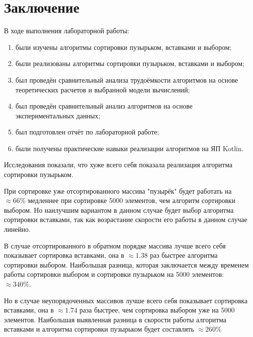 \documentclass[12pt]{report}
\begin{document}
\chapter*{Заключение}
В ходе выполнения лабораторной работы:
\begin{enumerate}
\item были изучены алгоритмы сортировки пузырьком, вставками и выбором;
\item были реализованы алгоритмы сортировки пузырьком, вставками и выбором;
\item был проведён сравнительный анализа трудоёмкости алгоритмов на основе теоретических расчетов и выбранной модели вычислений;
\item был проведён сравнительный анализ алгоритмов на основе экспериментальных данных;
\item был подготовлен отчёт по лабораторной работе;
\item были получены практические навыки реализации алгоритмов на ЯП Kotlin.
\end{enumerate}

Исследования показали, что хуже всего себя показала реализация алгоритма сортировки пузырьком.

При сортировке уже отсортированного массива "пузырёк" будет работать на $\approx 66\%$ медленнее при сортировке 5000 элементов, чем алгоритм сортировки выбором. Но наилучшим вариантом в данном случае будет выбор алгоритма сортировки вставками, так как возрастание скорости его работы в данном случае линейно.

В случае отсортированного в обратном порядке массива лучше всего себя показывает сортировка вставками, она в $\approx 1.38$ раз быстрее алгоритма сортировки выбором. Наибольшая разница, которая заключается между временем работы сортировки выбором и сортировки пузырьком на 5000 элементов: $\approx 340\%$.

Но в случае неупорядоченных массивов лучше всего себя показывает сортировка вставками, она в $\approx 1.74$ раза быстрее, чем сортировка выбором уже на 5000 элементов. Наибольшая выявленная разница в скорости работы алгоритма вставками и алгоритма сортировки пузырьком будет составлять $\approx 260\%$

\end{document}
